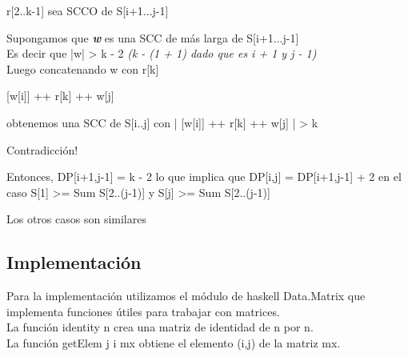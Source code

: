 \documentclass[10pt]{article}
\begin{document}
	r[2..k-1] sea SCCO de S[i+1...j-1]
	
	Supongamos que \textbf{\textit{w}} es una SCC de m\'as larga  de S[i+1...j-1]\\
	
	Es decir que |w| > k - 2 \textit{(k - (1 + 1)  dado que es i + 1 y j - 1)}\\
	
	Luego concatenando w con r[k]
	\begin{center}
		[w[i]] ++ r[k] ++ w[j]
	\end{center}
	
	obtenemos una SCC de S[i..j] con | [w[i]] ++ r[k] ++ w[j] | > k
	\begin{center}
		Contradicci\'on!
	\end{center}
	
	\begin{flushleft}
		Entonces, DP[i+1,j-1] = k - 2 lo que implica que
	DP[i,j] = DP[i+1,j-1] + 2 en el caso S[1] >= Sum S[2..(j-1)] y S[j] >= Sum S[2..(j-1)]
	\end{flushleft}
	
	\begin{flushleft}
		Los otros casos son similares
	\end{flushleft}
	\subsection*{Implementaci\'on}
	Para la implementaci\'on utilizamos el m\'odulo de haskell Data.Matrix que implementa funciones \'utiles para trabajar con matrices.\\
	
	La funci\'on identity n crea una matriz de identidad de n por n.\\
	
	La funci\'on getElem j i mx obtiene el elemento (i,j) de la matriz mx.\\
	
\end{document}
